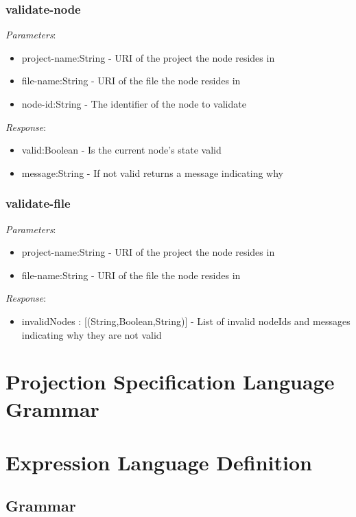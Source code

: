 \subsubsection{validate-node}

\emph{Parameters}: 
\begin{itemize}
\item project-name:String - URI of the project the node resides in
\item file-name:String - URI of the file the node resides in
\item node-id:String - The identifier of the node to validate
\end{itemize}
\emph{Response}: 
\begin{itemize}
\item valid:Boolean - Is the current node's state valid
\item message:String - If not valid returns a message indicating why
\end{itemize}

\subsubsection{validate-file}

\emph{Parameters}: 
\begin{itemize}
\item project-name:String - URI of the project the node resides in
\item file-name:String - URI of the file the node resides in
\end{itemize}
\emph{Response}: 
\begin{itemize}
\item invalidNodes : [(String,Boolean,String)] - List of invalid nodeIds and messages indicating why they are not valid
\end{itemize}


\section{Projection Specification Language Grammar}\label{editorLanguageGrammar}


\section{Expression Language Definition}\label{expressionLanguageDef}
\subsection{Grammar}


